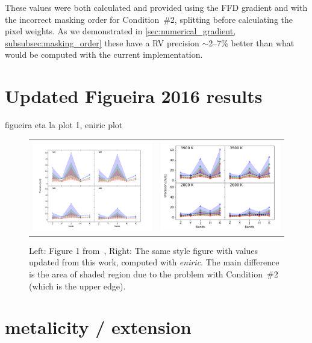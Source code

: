 These values were both calculated and provided using the {FFD} gradient and with the incorrect masking order for Condition~\#2, splitting before calculating the pixel weights.
As we demonstrated in \cref{sec:numerical_gradient, subsubsec:masking_order} these have a {RV} precision \(\sim\)2--7\% better than what would be computed with the current implementation.


\section{ Updated Figueira 2016 results}
 figueira eta la plot 1, eniric plot

\begin{figure}
    \centering
    \begin{tabular}{cc}
    \includegraphics[width=0.48\linewidth]{figures/information-content/Rvprec_vsini1.pdf} &  %
    \includegraphics[width=0.47\linewidth]{figures/information-content/precision_fourpanel.png}\\ %
    \end{tabular}
    \caption{Left: Figure 1 from~\citet{figueira_radial_2016}, Right: The same style figure with values updated from this work, computed with \emph{eniric}.
The main difference is the area of shaded region due to the problem with Condition~\#2 (which is the upper edge).}
    \label{fig:my_label}
\end{figure}

\section{ metalicity / \logg{} extension}



